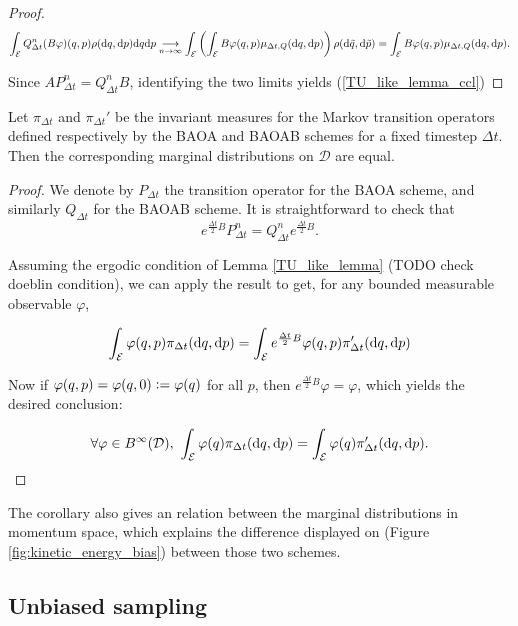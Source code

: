 \begin{lemma}
\begin{proof}
        $$ \int_{\mathcal E} Q_{\Delta t}^n (B\varphi)(q,p) \rho(\text d q,\text d p) \text d q \text d p \underset{n\to\infty}{\longrightarrow}\int_{\mathcal E} \left (\int_{\mathcal E}B\varphi(q,p)\mu_{\Delta t,Q}(\text d q,\text d p)\right)\rho(\text d \tilde q,\text d \tilde p)=\int_{\mathcal E}B\varphi(q,p)\mu_{\Delta t,Q}(\text d q,\text d p).$$

        Since $AP_{\Delta t}^n=Q_{\Delta t}^n B$, identifying the two limits yields (\ref{TU_like_lemma_ccl})
    \end{proof}
\end{lemma}

\begin{corollary}
Let $ \pi_{\Delta t}$ and $\pi_{\Delta t}'$ be the invariant measures for the Markov transition operators defined respectively by the BAOA and BAOAB schemes for a fixed timestep $\Delta t$. Then the corresponding marginal distributions on $\mathcal D$ are equal.

\begin{proof}
    We denote by $P_{\Delta t}$ the transition operator for the BAOA scheme, and similarly $Q_{\Delta t}$ for the BAOAB scheme. It is straightforward to check that 
    $$ e^{\frac{\Delta t}2 B}P_{\Delta t}^n=Q_{\Delta t}^n e^{\frac{\Delta t}2 B}.$$

    Assuming the ergodic condition of Lemma \ref{TU_like_lemma} (TODO check doeblin condition), we can apply the result to get, for any bounded measurable observable $\varphi$,

    $$ \int_{\mathcal E} \varphi(q,p)\pi_{\Delta t}(\text d q,\text d p)=\int_{\mathcal E} e^{\frac{\Delta t}2 B}\varphi(q,p)\pi'_{\Delta t}(\text d q,\text d p)$$

    Now if $\varphi (q,p)= \varphi (q,0) \mathrel{\mathop:}= \varphi(q)$ for all $p$, then $e^{\frac{\Delta t}2 B}\varphi=\varphi$, which yields the desired conclusion:

    $$\forall \varphi \in B^\infty(\mathcal D),\ \int_{\mathcal E} \varphi(q)\pi_{\Delta t}(\text d q,\text d p)=\int_{\mathcal E}\varphi(q)\pi'_{\Delta t}(\text d q,\text d p).$$
\end{proof}

\end{corollary}

The corollary also gives an relation between the marginal distributions in momentum space, which explains the difference displayed on (Figure \ref{fig:kinetic_energy_bias}) between those two schemes.

\subsection{Unbiased sampling}
